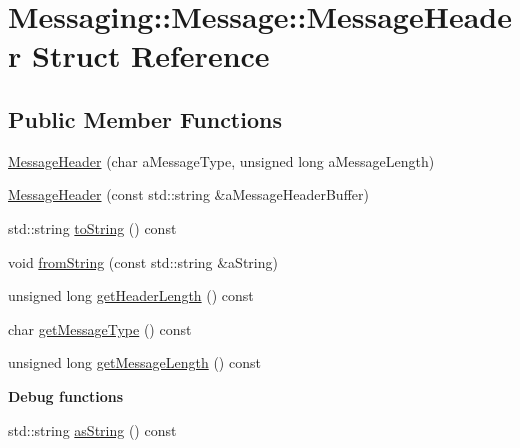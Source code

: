 \hypertarget{struct_messaging_1_1_message_1_1_message_header}{}\section{Messaging\+:\+:Message\+:\+:Message\+Header Struct Reference}
\label{struct_messaging_1_1_message_1_1_message_header}
\subsection*{Public Member Functions}
\begin{DoxyCompactItemize}
\item 
\hyperlink{struct_messaging_1_1_message_1_1_message_header_a4c1145a87de865721d59faba878540fe}{Message\+Header} (char a\+Message\+Type, unsigned long a\+Message\+Length)
\item 
\hyperlink{struct_messaging_1_1_message_1_1_message_header_acc197565a5646945320b275fc7432757}{Message\+Header} (const std\+::string \&a\+Message\+Header\+Buffer)
\item 
std\+::string \hyperlink{struct_messaging_1_1_message_1_1_message_header_a116958570c3ee6e61949d3f25c58d0d6}{to\+String} () const 
\item 
void \hyperlink{struct_messaging_1_1_message_1_1_message_header_a2d6cc32d14554859cc042ae608daee6e}{from\+String} (const std\+::string \&a\+String)
\item 
unsigned long \hyperlink{struct_messaging_1_1_message_1_1_message_header_a0d33aa180bd6d8dc9e34b02b4fe3e492}{get\+Header\+Length} () const 
\item 
char \hyperlink{struct_messaging_1_1_message_1_1_message_header_aef4edcff25790eb3120399b96f8c88d1}{get\+Message\+Type} () const 
\item 
unsigned long \hyperlink{struct_messaging_1_1_message_1_1_message_header_aa89056eba883f701deb9a9fe12b27ffa}{get\+Message\+Length} () const 
\end{DoxyCompactItemize}
\begin{Indent}{\bf Debug functions}\par
\begin{DoxyCompactItemize}
\item 
std\+::string \hyperlink{struct_messaging_1_1_message_1_1_message_header_acdae8972e623d75bd1c7f84e9bf88112}{as\+String} () const 
\end{DoxyCompactItemize}
\end{Indent}

